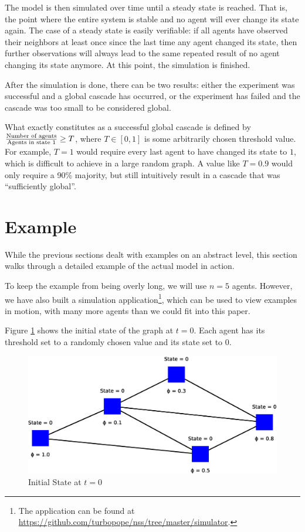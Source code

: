 \documentclass{sig-alternate-05-2015}
\begin{document}
The model is then simulated over time until a steady state is reached. That is, the point where the entire system is stable and no agent will ever change its state again. The case of a steady state is easily verifiable: if all agents have observed their neighbors at least once since the last time any agent changed its state, then further observations will always lead to the same repeated result of no agent changing its state anymore. At this point, the simulation is finished.

After the simulation is done, there can be two results: either the experiment was successful and a global cascade has occurred, or the experiment has failed and the cascade was too small to be considered global.

What exactly constitutes as a successful global cascade is defined by $\frac{\textmd{Number of agents}}{\textmd{Agents in state } 1} \geq T$, where $T \in [0, 1]$ is some arbitrarily chosen threshold value. For example, $T = 1$ would require every last agent to have changed its state to $1$, which is difficult to achieve in a large random graph. A value like $T = 0.9$ would only require a 90\% majority, but still intuitively result in a cascade that was ``sufficiently global''.


\section{Example}\label{sec:example}

While the previous sections dealt with examples on an abstract level, this section walks through a detailed example of the actual model in action.

To keep the example from being overly long, we will use $n = 5$ agents. However, we have also built a simulation application\footnote{The application can be found at \url{https://github.com/turbopope/nss/tree/master/simulator}.}, which can be used to view examples in motion, with many more agents than we could fit into this paper.

Figure \ref{fig:model1} shows the initial state of the graph at $t = 0$. Each agent has its threshold set to a randomly chosen value and its state set to $0$.

\begin{figure}[h!]
    \includegraphics[width=\columnwidth]{../presentation/img/model4}
    \centering
    \caption{Initial State at $t = 0$}
    \label{fig:model1}
\end{figure}
\end{document}
